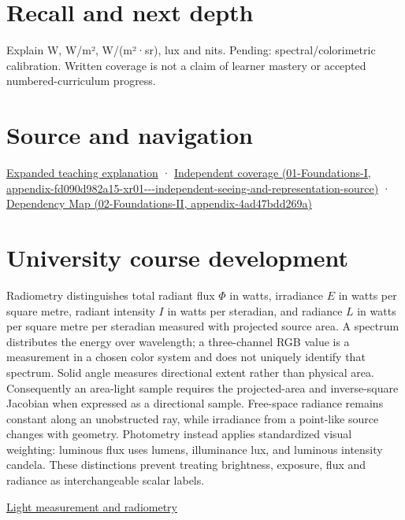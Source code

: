 \section{Recall and next depth}\label{appendix-215c2570199b-recall-and-next-depth}

Explain W, W/m², W/(m²·sr), lux and nits. Pending: spectral/colorimetric calibration. Written coverage is not a claim of learner mastery or accepted numbered-curriculum progress.

\section{Source and navigation}\label{appendix-215c2570199b-source-and-navigation}

\href{Continuous\%20Notes/University\%20-\%20Worlds,\%20Images\%20and\%20Inference\%20-\%20Graphics,\%20Vision\%20and\%20Photography\#Light\%20must\%20become\%20a\%20quantity\%20before\%20it\%20becomes\%20a\%20color}{Expanded teaching explanation} · \href{../01-Foundations-I/main.pdf\#nameddest=appendix-fd090d982a15-xr01---independent-seeing-and-representation-source}{Independent coverage (01-Foundations-I, appendix-fd090d982a15-xr01-\/-\/-independent-seeing-and-representation-source)} · \href{../02-Foundations-II/main.pdf\#nameddest=appendix-4ad47bdd269a}{Dependency Map (02-Foundations-II, appendix-4ad47bdd269a)}

\section{University course development}\label{appendix-215c2570199b-university-course-development}

Radiometry distinguishes total radiant flux \(\Phi\) in watts, irradiance \(E\) in watts per square metre, radiant intensity \(I\) in watts per steradian, and radiance \(L\) in watts per square metre per steradian measured with projected source area. A spectrum distributes the energy over wavelength; a three-channel RGB value is a measurement in a chosen color system and does not uniquely identify that spectrum. Solid angle measures directional extent rather than physical area. Consequently an area-light sample requires the projected-area and inverse-square Jacobian when expressed as a directional sample. Free-space radiance remains constant along an unobstructed ray, while irradiance from a point-like source changes with geometry. Photometry instead applies standardized visual weighting: luminous flux uses lumens, illuminance lux, and luminous intensity candela. These distinctions prevent treating brightness, exposure, flux and radiance as interchangeable scalar labels.

\href{Continuous\%20Notes/University\%20-\%20Worlds,\%20Images\%20and\%20Inference\%20-\%20Graphics,\%20Vision\%20and\%20Photography\#Light\%20measurement\%20and\%20radiometry}{Light measurement and radiometry}
